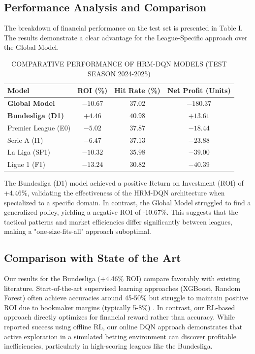 \documentclass[3p,times,procedia]{elsarticle}
\begin{document}
\subsection{Performance Analysis and Comparison}
The breakdown of financial performance on the test set is presented in Table I. The results demonstrate a clear advantage for the League-Specific approach over the Global Model.
\begin{table}[!h]
\caption{COMPARATIVE PERFORMANCE OF HRM-DQN MODELS (TEST SEASON 2024-2025)}
\label{tab:performance_comparison}
\centering\small
\begin{tabular}{lccc}
\toprule
\textbf{Model} & \textbf{ROI (\%)} & \textbf{Hit Rate (\%)} & \textbf{Net Profit (Units)} \\
\midrule
\textbf{Global Model} & $-10.67$ & $37.02$ & $-180.37$ \\
\textbf{Bundesliga (D1)} & $\mathbf{+4.46}$ & $\mathbf{40.98}$ & $\mathbf{+13.61}$ \\
Premier League (E0) & $-5.02$ & $37.87$ & $-18.44$ \\
Serie A (I1) & $-6.47$ & $37.13$ & $-23.88$ \\
La Liga (SP1) & $-10.32$ & $35.98$ & $-39.00$ \\
Ligue 1 (F1) & $-13.24$ & $30.82$ & $-40.39$ \\
\bottomrule
\end{tabular}
\end{table}

The Bundesliga (D1) model achieved a positive Return on Investment (ROI) of +4.46\%, validating the effectiveness of the HRM-DQN architecture when specialized to a specific domain. In contrast, the Global Model struggled to find a generalized policy, yielding a negative ROI of -10.67\%. This suggests that the tactical patterns and market efficiencies differ significantly between leagues, making a "one-size-fits-all" approach suboptimal.

\subsection{Comparison with State of the Art}
Our results for the Bundesliga (+4.46\% ROI) compare favorably with existing literature. Start-of-the-art supervised learning approaches (XGBoost, Random Forest) often achieve accuracies around 45-50\% but struggle to maintain positive ROI due to bookmaker margins (typically 5-8\%) \cite{atta2024data, leckey2025machine}. In contrast, our RL-based approach directly optimizes for financial reward rather than accuracy. While \cite{rahimian2024game} reported success using offline RL, our online DQN approach demonstrates that active exploration in a simulated betting environment can discover profitable inefficiencies, particularly in high-scoring leagues like the Bundesliga.
\end{document}
